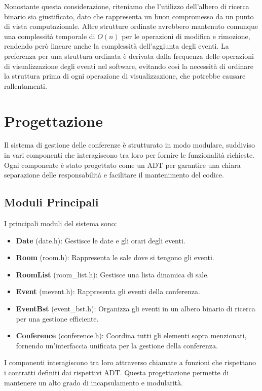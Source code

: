 \documentclass[11pt]{scrartcl} %
\begin{document}
Nonostante questa considerazione, riteniamo che l'utilizzo dell'albero di ricerca binario sia giustificato, dato che rappresenta un buon compromesso da un punto di vista computazionale. Altre strutture ordinate avrebbero mantenuto comunque una complessità temporale di \( O(n) \) per le operazioni di modifica e rimozione, rendendo però lineare anche la complessità dell'aggiunta degli eventi. La preferenza per una struttura ordinata è derivata dalla frequenza delle operazioni di visualizzazione degli eventi nel software, evitando così la necessità di ordinare la struttura prima di ogni operazione di visualizzazione, che potrebbe causare rallentamenti.


\section{Progettazione}

Il sistema di gestione delle conferenze è strutturato in modo modulare, suddiviso in vari componenti che interagiscono tra loro per fornire le funzionalità richieste. Ogni componente è stato progettato come un ADT per garantire una chiara separazione delle responsabilità e facilitare il mantenimento del codice.

\subsection{Moduli Principali}
I principali moduli del sistema sono:

\begin{itemize}
    \item \textbf{Date} (date.h): Gestisce le date e gli orari degli eventi.
    \item \textbf{Room} (room.h): Rappresenta le sale dove si tengono gli eventi.
    \item \textbf{RoomList} (room\_list.h): Gestisce una lista dinamica di sale.
    \item \textbf{Event} (mevent.h): Rappresenta gli eventi della conferenza.
    \item \textbf{EventBst} (event\_bst.h): Organizza gli eventi in un albero binario di ricerca per una gestione efficiente.
    \item \textbf{Conference} (conference.h): Coordina tutti gli elementi sopra menzionati, fornendo un'interfaccia unificata per la gestione della conferenza.
\end{itemize}

I componenti interagiscono tra loro attraverso chiamate a funzioni che rispettano i contratti definiti dai rispettivi ADT. Questa progettazione permette di mantenere un alto grado di incapsulamento e modularità.
\end{document}
